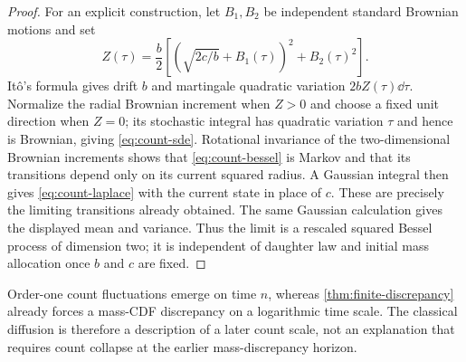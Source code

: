 \begin{proof}
For an explicit construction, let $B_1,B_2$ be independent standard
Brownian motions and set
\begin{equation}
 Z(\tau)=\frac b2
 \left[(\sqrt{2c/b}+B_1(\tau))^2+B_2(\tau)^2\right].
 \label{eq:count-bessel}
\end{equation}
It\^o's formula gives drift $b$ and martingale quadratic variation
$2bZ(\tau)\dd\tau$. Normalize the radial Brownian increment when $Z>0$
and choose a fixed unit direction when $Z=0$; its stochastic integral has
quadratic variation $\tau$ and hence is Brownian, giving
\eqref{eq:count-sde}. Rotational invariance of the two-dimensional Brownian
increments shows that \eqref{eq:count-bessel} is Markov and that its
transitions depend only on its current squared radius. A Gaussian integral
then gives \eqref{eq:count-laplace} with the current state in place of $c$.
These are precisely the limiting transitions already obtained. The same
Gaussian calculation gives the displayed mean and variance. Thus the limit
is a rescaled squared Bessel process of dimension two; it is independent
of daughter law and initial mass allocation once $b$ and $c$ are fixed.
\end{proof}

Order-one count fluctuations emerge on time $n$, whereas
\cref{thm:finite-discrepancy} already forces a mass-CDF discrepancy on a
logarithmic time scale. The classical diffusion is therefore a description
of a later count scale, not an explanation that requires count collapse at
the earlier mass-discrepancy horizon.
